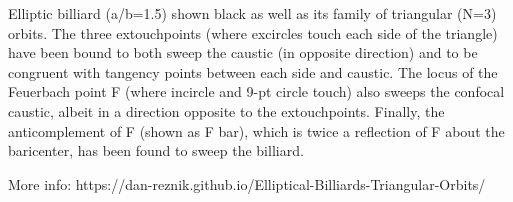 Elliptic billiard (a/b=1.5) shown black as well as its family of triangular (N=3) orbits. The three extouchpoints (where excircles touch each side of the triangle) have been bound to both sweep the caustic (in opposite direction) and to be congruent with tangency points between each side and caustic. The locus of the Feuerbach point F (where incircle and 9-pt circle touch) also sweeps the confocal caustic, albeit in a direction opposite to the extouchpoints. Finally, the anticomplement of F (shown as F bar), which is twice a reflection of F about the baricenter, has been found to sweep the billiard.

More info: https://dan-reznik.github.io/Elliptical-Billiards-Triangular-Orbits/